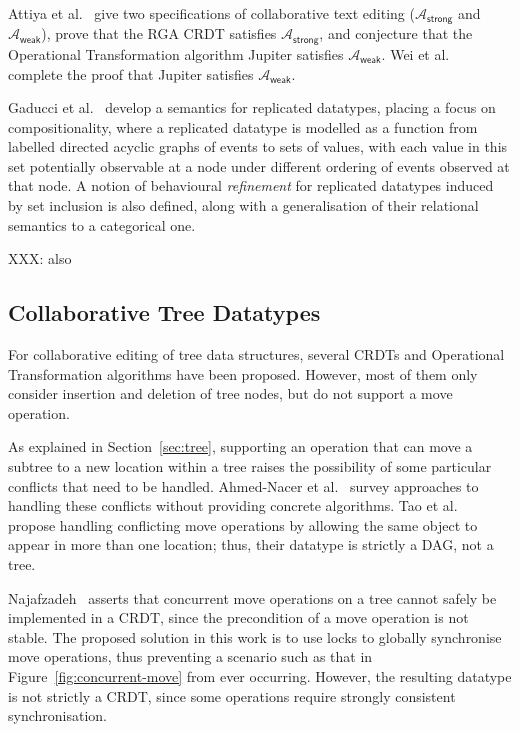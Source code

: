 Attiya et al.~\cite{Attiya:2016kh} give two specifications of collaborative text editing ($\mathcal{A}_\textsf{strong}$ and $\mathcal{A}_\textsf{weak}$), prove that the RGA CRDT \cite{Roh:2011dw} satisfies $\mathcal{A}_\textsf{strong}$, and conjecture that the Operational Transformation algorithm Jupiter \cite{Nichols:1995fd} satisfies $\mathcal{A}_\textsf{weak}$.
Wei et al.~\cite{Wei:2017tg} complete the proof that Jupiter satisfies $\mathcal{A}_\textsf{weak}$.

Gaducci et al.~\cite{DBLP:conf/coordination/GadducciMR17} develop a semantics for replicated datatypes, placing a focus on compositionality, where a replicated datatype is modelled as a function from labelled directed acyclic graphs of events to sets of values, with each value in this set potentially observable at a node under different ordering of events observed at that node.
A notion of behavioural \emph{refinement} for replicated datatypes induced by set inclusion is also defined, along with a generalisation of their relational semantics to a categorical one.

XXX: also~\cite{DBLP:conf/atva/MukundRS15}

\subsection{Collaborative Tree Datatypes}

For collaborative editing of tree data structures, several CRDTs \cite{Martin:2010ih,Kleppmann:2016ve} and Operational Transformation algorithms \cite{Jungnickel:2016cb,Ignat:2003jy,Davis:2002iv} have been proposed.
However, most of them only consider insertion and deletion of tree nodes, but do not support a move operation.

As explained in Section~\ref{sec:tree}, supporting an operation that can move a subtree to a new location within a tree raises the possibility of some particular conflicts that need to be handled.
Ahmed-Nacer et al.~\cite{AhmedNacer:2012us} survey approaches to handling these conflicts without providing concrete algorithms.
Tao et al.~\cite{Tao:2015gd} propose handling conflicting move operations by allowing the same object to appear in more than one location; thus, their datatype is strictly a DAG, not a tree.

Najafzadeh~\cite{Najafzadeh:2017vk} asserts that concurrent move operations on a tree cannot safely be implemented in a CRDT, since the precondition of a move operation is not stable.
The proposed solution in this work is to use locks to globally synchronise move operations, thus preventing a scenario such as that in Figure~\ref{fig:concurrent-move} from ever occurring.
However, the resulting datatype is not strictly a CRDT, since some operations require strongly consistent synchronisation.

